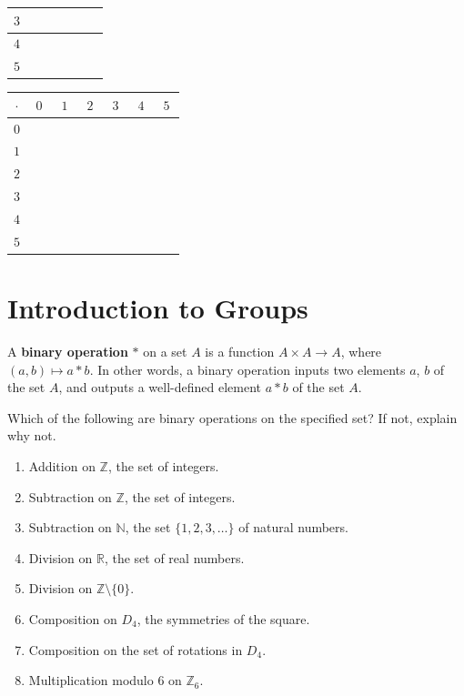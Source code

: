 \begin{enumerate}
\begin{center}
\begin{tabular}{|c||c|c|c|c|c|c|}
        $3$ & & & & & & \\ \hline
        $4$ & & & & & & \\ \hline
        $5$ & & & & & & \\ \hline
    \end{tabular}
    \hspace{0.5in}
    \begin{tabular}{|c||c|c|c|c|c|c|} \hline
        $\cdot$ & $0$ & $1$ & $2$ & $3$ & $4$ & $5$ \\ \hline \hline
        $0$ & $\phantom{00}$ & $\phantom{00}$ & $\phantom{00}$ & $\phantom{00}$ & $\phantom{00}$ & $\phantom{00}$ \\ \hline
        $1$ & & & & & & \\ \hline
        $2$ & & & & & & \\ \hline
        $3$ & & & & & & \\ \hline
        $4$ & & & & & & \\ \hline
        $5$ & & & & & & \\ \hline
    \end{tabular}
    \end{center}
\end{enumerate}

\chapter{Introduction to Groups}

\begin{definition}
    A \textbf{binary operation} \(*\) on a set \(A\) is a function \(A \times A \rightarrow A\), where \((a,b) \mapsto a*b\).  In other words, a binary operation inputs two elements \(a\), \(b\) of the set \(A\), and outputs a well-defined element \(a * b\) of the set \(A\).
\end{definition}

\begin{problem}\label{prob:binops}
Which of the following are binary operations on the specified set? If not, explain why not.
\begin{enumerate}
  \item Addition on \(\mathbb{Z}\), the set of integers.
  \item Subtraction on \(\mathbb{Z}\), the set of integers.
  \item Subtraction on \(\mathbb{N}\), the set \(\{1,2,3,\ldots\}\) of natural numbers.
  \item Division on \(\mathbb{R}\), the set of real numbers.
  \item Division on \(\mathbb{Z}\setminus \{0\}\).
  \item Composition on \(D_4\), the symmetries of the square.
  \item Composition on the set of rotations in \(D_4\).
  \item Multiplication modulo 6 on \(\mathbb{Z}_6\).
\end{enumerate}
\end{problem}

